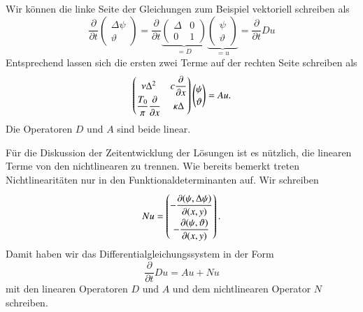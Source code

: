 Wir können die linke Seite der Gleichungen zum Beispiel vektoriell schreiben
als
\[
\frac{\partial}{\partial t}
\begin{pmatrix}
\Delta\psi\\\vartheta
\end{pmatrix}
=
\frac{\partial}{\partial t}
\underbrace{
\begin{pmatrix}
\Delta &  0 \\
   0   &  1
\end{pmatrix}
}_{\displaystyle=D}
\underbrace{
\begin{pmatrix}
\psi\\\vartheta
\end{pmatrix}
}_{\displaystyle=u}
=
\frac{\partial}{\partial t} Du
\]
Entsprechend lassen sich die ersten zwei Terme auf der rechten Seite 
schreiben als
\[
\def\arraystretch{1.1}
\begin{pmatrix}
\nu\Delta^2     & \displaystyle c\frac{\partial}{\partial x}\\
\displaystyle \frac{T_0}{\pi}\frac{\partial}{\partial x}    &\kappa\Delta
\end{pmatrix}
\begin{pmatrix}
\psi\\\vartheta
\end{pmatrix}
=
Au.
\]
Die Operatoren $D$ und $A$ sind beide linear.

Für die Diskussion der Zeitentwicklung der Lösungen ist es nützlich,
die linearen Terme von den nichtlinearen zu trennen.
Wie bereits bemerkt treten Nichtlinearitäten nur in den
Funktionaldeterminanten auf.
Wir schreiben
\[
Nu
=
\def\arraystretch{1.9}
\begin{pmatrix}
\displaystyle
-\frac{\partial(\psi,\Delta\psi)}{\partial(x,y)}\\
\displaystyle
-\frac{\partial(\psi,\vartheta)}{\partial(x,y)}
\end{pmatrix}.
\]
Damit haben wir das Differentialgleichungssystem in der Form
\begin{equation}
\frac{\partial}{\partial t}Du
=
Au+Nu
\label{skript:allgemeinesmodell}
\end{equation}
mit den linearen Operatoren $D$ und $A$ und dem nichtlinearen Operator
$N$ schreiben.

